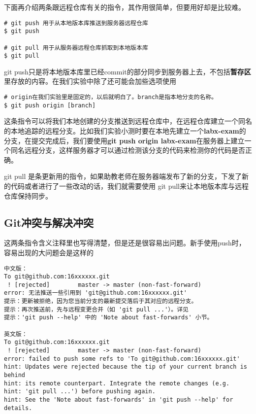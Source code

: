 下面再介绍两条跟远程仓库有关的指令，其作用很简单，但要用好却是比较难。
\begin{verbatim}
# git push 用于从本地版本库推送到服务器远程仓库
$ git push

# git pull 用于从服务器远程仓库抓取到本地版本库
$ git pull
\end{verbatim}
git push只是将本地版本库里已经commit的部分同步到服务器上去，不包括\textbf{暂存区}里存放的内容。在我们实验中除了还可能会加些选项使用

\begin{verbatim}
# origin在我们实验里是固定的，以后就明白了。branch是指本地分支的名称。
$ git push origin [branch]
\end{verbatim}

这条指令可以将我们本地创建的分支推送到远程仓库中，在远程仓库建立一个同名的本地追踪的远程分支。比如我们实验小测时要在本地先建立一个\textbf{labx-exam}的分支，在提交完成后，我们要使用\textbf{git push origin labx-exam}在服务器上建立一个同名远程分支，这样服务器才可以通过检测该分支的代码来检测你的代码是否正确。

git pull\label{更新指令} 是条更新用的指令，如果助教老师在服务器端发布了新的分支，下发了新的代码或者进行了一些改动的话，我们就需要使用 git pull来让本地版本库与远程仓库保持同步。

\subsection{Git冲突与解决冲突}

这两条指令含义注释里也写得清楚，但是还是很容易出问题。新手使用push时，容易出现的大问题会是这样的

\begin{verbatim}
中文版：
To git@github.com:16xxxxxx.git
 ! [rejected]        master -> master (non-fast-forward)
error: 无法推送一些引用到 'git@github.com:16xxxxxx.git'
提示：更新被拒绝，因为您当前分支的最新提交落后于其对应的远程分支。
提示：再次推送前，先与远程变更合并（如 'git pull ...'）。详见
提示：'git push --help' 中的 'Note about fast-forwards' 小节。

英文版：
To git@github.com:16xxxxxx.git
 ! [rejected]        master -> master (non-fast-forward)
error: failed to push some refs to 'To git@github.com:16xxxxxx.git'
hint: Updates were rejected because the tip of your current branch is behind
hint: its remote counterpart. Integrate the remote changes (e.g.
hint: 'git pull ...') before pushing again.
hint: See the 'Note about fast-forwards' in 'git push --help' for details.
\end{verbatim}


